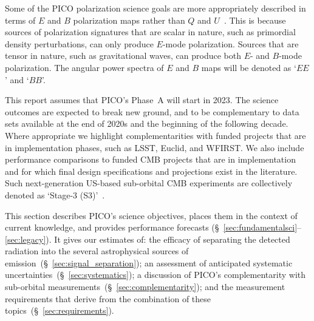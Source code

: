 \documentclass[PICOReport.tex]{subfiles}
\begin{document}

Some of the PICO polarization science goals are more appropriately described in terms of $E$ and $B$ polarization maps rather than $Q$ and $U$~\cite{seljak97,kamionkowski97a, zaldarriaga97b,kamionkowski97b}. This is because sources of polarization signatures that are scalar in nature, such as primordial density perturbations, can only produce $E$-mode polarization. Sources that are tensor in nature, such as gravitational waves, can produce both $E$- and $B$-mode polarization. The angular power spectra of $E$ and $B$ maps will be denoted as `$EE$' and `$BB$'.

This report assumes that PICO's Phase~A will start in 2023. The science outcomes are expected to break new ground, and to be complementary to data sets available at the end of 2020s and the beginning of the following decade. Where appropriate we highlight complementarities with funded projects that are in implementation phases, such as LSST, Euclid, and WFIRST. We also include performance comparisons to funded CMB projects that are in implementation and for which final design specifications and projections exist in the literature. Such next-generation US-based sub-orbital CMB experiments are collectively denoted as `Stage-3 (S3)'~\citep{advancedact,spt3g,so,class_overview,biceparray,spider,piper}. 


This section describes PICO's science objectives, places them in the context of current knowledge, and provides performance forecasts (\S~\ref{sec:fundamentalsci}--\ref{sec:legacy}). It gives our estimates of: the efficacy of separating the detected radiation into the several astrophysical sources of emission~(\S~\ref{sec:signal_separation}); an assessment of anticipated systematic uncertainties~(\S~\ref{sec:systematics}); a discussion of PICO's complementarity with sub-orbital measurements~(\S~\ref{sec:complementarity}); and the measurement requirements that derive from the combination of these topics~(\S~\ref{sec:requirements}).  
\end{document}
